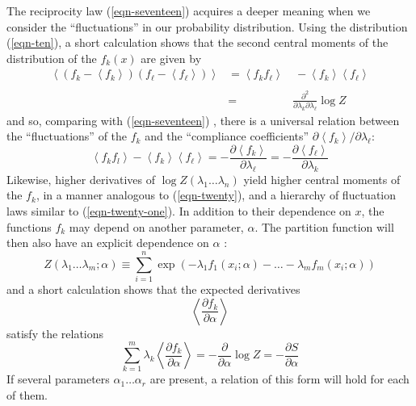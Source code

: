 \documentclass[]{article}
\begin{document}
The reciprocity law (\ref{eqn-seventeen}) acquires a deeper meaning when we consider the
``fluctuations'' in our probability distribution. Using the distribution
(\ref{eqn-ten}), a short calculation shows that the second central moments of the
distribution of the \(f_{k}(x)\) are given by
%
\begin{align}
\left\langle \left( f_{k} - \left\langle f_{k} \right\rangle \right)\left( f_{ \ell} - \left\langle f_{ \ell} \right\rangle \right) \right\rangle & = \left\langle f_{k}f_{ \ell} \right\rangle & \  - \left\langle f_{k} \right\rangle\left\langle f_{ \ell} \right\rangle \nonumber \\
& \label{eqn-twenty} \\
 & = & \frac{\partial^{2}}{\partial\lambda_{k}\partial\lambda_{ \ell}} \log Z \nonumber
\end{align}
%
and so, comparing with (\ref{eqn-seventeen}) , there is a universal relation between the
``fluctuations'' of the \(f_{k}\) and the ``compliance coefficients''
\(\partial\left\langle f_{k} \right\rangle/\partial\lambda_{ \ell}:\)
%
\begin{equation}
\left\langle f_{k}f_{l} \right\rangle - \left\langle f_{k} \right\rangle\left\langle f_{ \ell} \right\rangle = - \frac{\partial\left\langle f_{k} \right\rangle}{\partial\lambda_{ \ell}} = - \frac{\partial\left\langle f_{ \ell} \right\rangle}{\partial\lambda_{k}} \label{eqn-twenty-one}
\end{equation}
%
Likewise, higher derivatives of
\( \log Z\left( \lambda_{1}\ldots\lambda_{n} \right)\) yield higher central
moments of the \(f_{k}\), in a manner analogous to (\ref{eqn-twenty}), and a hierarchy
of fluctuation laws similar to (\ref{eqn-twenty-one}).
%
In addition to their dependence on \(x\), the functions \(f_{k}\) may
depend on another parameter, \(\alpha.\) The partition function will
then also have an explicit dependence on \(\alpha\) :
%
\begin{equation}
Z\left( \lambda_{1}\ldots\lambda_{m};\alpha \right) \equiv \sum_{i = 1}^{n}  \exp\left( - \lambda_{1}f_{1}\left( x_{i};\alpha \right) - \ldots - \lambda_{m}f_{m}\left( x_{i};\alpha \right) \right)
\end{equation}
%
and a short calculation shows that the expected derivatives
%
\begin{equation*}
\left\langle \frac{\partial f_{k}}{\partial\alpha} \right\rangle
\end{equation*}
%
satisfy the relations
%
\begin{equation}
\sum_{k = 1}^{m} \lambda_{k}\left\langle \frac{\partial f_{k}}{\partial\alpha} \right\rangle = - \frac{\partial}{\partial\alpha} \log Z = - \frac{\partial S}{\partial\alpha} \label{eqn-twenty-three}
\end{equation}
%
If several parameters \(\alpha_{1}\ldots\alpha_{r}\) are present, a
relation of this form will hold for each of them.
\end{document}
